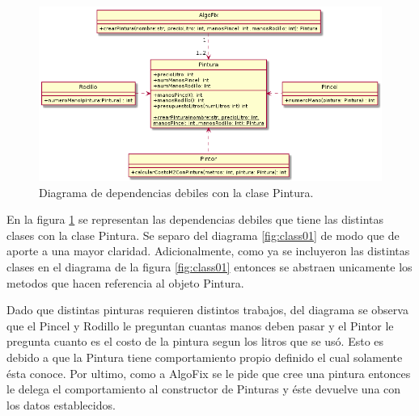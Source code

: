 \documentclass[titlepage,a4paper]{article}
\begin{document}
\begin{figure}[H]
\centering
\includegraphics[width=1\textwidth]{diagrama_clase02.png}
\caption{\label{fig:class02}Diagrama de dependencias debiles con la clase Pintura.}
\end{figure}

En la figura \ref{fig:class02} se representan las dependencias debiles que tiene las distintas clases con la clase Pintura. Se separo del diagrama \ref{fig:class01} de modo que
 de aporte a una mayor claridad. Adicionalmente, como ya se incluyeron las distintas clases en el diagrama de la figura \ref{fig:class01} 
entonces se abstraen unicamente los metodos que hacen referencia al objeto Pintura.\newline

Dado que distintas pinturas requieren distintos trabajos, del diagrama se observa que el Pincel y Rodillo le preguntan cuantas manos deben pasar y el Pintor le pregunta
cuanto es el costo de la pintura segun los litros que se usó. Esto es debido a que la Pintura tiene comportamiento propio definido el cual solamente ésta conoce. 
Por ultimo, como a AlgoFix se le pide que cree una pintura entonces le delega el comportamiento al constructor de Pinturas y éste devuelve una con los datos establecidos.



\end{document}
